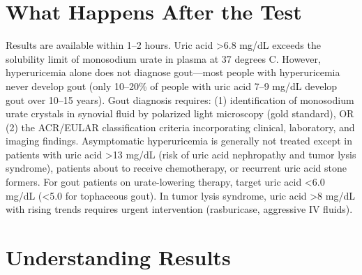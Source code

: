 \section*{What Happens After the Test}
Results are available within 1--2 hours. Uric acid >6.8 mg/dL exceeds the solubility limit of monosodium urate in plasma at 37 degrees C. However, hyperuricemia alone does not diagnose gout---most people with hyperuricemia never develop gout (only 10--20\% of people with uric acid 7--9 mg/dL develop gout over 10--15 years). Gout diagnosis requires: (1) identification of monosodium urate crystals in synovial fluid by polarized light microscopy (gold standard), OR (2) the ACR/EULAR classification criteria incorporating clinical, laboratory, and imaging findings. Asymptomatic hyperuricemia is generally not treated except in patients with uric acid >13 mg/dL (risk of uric acid nephropathy and tumor lysis syndrome), patients about to receive chemotherapy, or recurrent uric acid stone formers. For gout patients on urate-lowering therapy, target uric acid <6.0 mg/dL (<5.0 for tophaceous gout). In tumor lysis syndrome, uric acid >8 mg/dL with rising trends requires urgent intervention (rasburicase, aggressive IV fluids).

\section*{Understanding Results}

